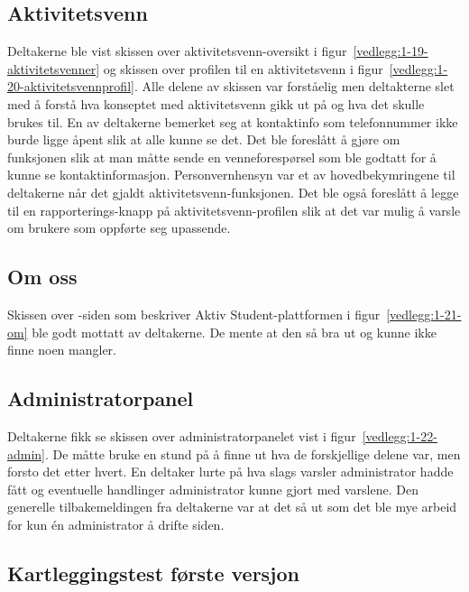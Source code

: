 \subsection{Aktivitetsvenn}

Deltakerne ble vist skissen over aktivitetsvenn-oversikt i figur~\ref{vedlegg:1-19-aktivitetsvenner} og skissen over profilen til en aktivitetsvenn i figur~\ref{vedlegg:1-20-aktivitetsvennprofil}. Alle delene av skissen var forståelig men deltakterne slet med å forstå hva konseptet med aktivitetsvenn gikk ut på og hva det skulle brukes til. En av deltakerne bemerket seg at kontaktinfo som telefonnummer ikke burde ligge åpent slik at alle kunne se det. Det ble foreslått å gjøre om funksjonen slik at man måtte sende en venneforespørsel som ble godtatt for å kunne se kontaktinformasjon. Personvernhensyn var et av hovedbekymringene til deltakerne når det gjaldt aktivitetsvenn-funksjonen. Det ble også foreslått å legge til en rapporterings-knapp på aktivitetsvenn-profilen slik at det var mulig å varsle om brukere som oppførte seg upassende.


\subsection{Om oss}

Skissen over -siden som beskriver Aktiv Student-plattformen i figur~\ref{vedlegg:1-21-om} ble godt mottatt av deltakerne. De mente at den så bra ut og kunne ikke finne noen mangler.

\subsection{Administratorpanel}

Deltakerne fikk se skissen over administratorpanelet vist i figur~\ref{vedlegg:1-22-admin}. De måtte bruke en stund på å finne ut hva de forskjellige delene var, men forsto det etter hvert. En deltaker lurte på hva slags varsler administrator hadde fått og eventuelle handlinger administrator kunne gjort med varslene. Den generelle tilbakemeldingen fra deltakerne var at det så ut som det ble mye arbeid for kun én administrator å drifte siden.


\subsection{Kartleggingstest første versjon}

